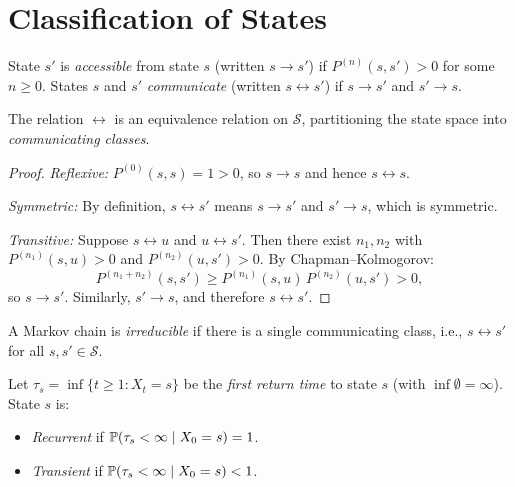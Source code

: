 \documentclass[11pt,a4paper]{article}
\begin{document}

\section{Classification of States}
\label{sec:classification}

\begin{definition}
\label{def:accessibility}
State $s'$ is \emph{accessible} from state $s$
(written $s \to s'$) if $P^{(n)}(s, s') > 0$ for some
$n \geq 0$.  States $s$ and $s'$ \emph{communicate}
(written $s \leftrightarrow s'$) if $s \to s'$ and $s' \to s$.
\end{definition}

\begin{proposition}
\label{prop:communication}
The relation $\leftrightarrow$ is an equivalence relation on
$\mathcal{S}$, partitioning the state space into
\emph{communicating classes}.
\end{proposition}

\begin{proof}
\textit{Reflexive:}  $P^{(0)}(s, s) = 1 > 0$, so $s \to s$ and
hence $s \leftrightarrow s$.

\textit{Symmetric:}  By definition, $s \leftrightarrow s'$ means
$s \to s'$ and $s' \to s$, which is symmetric.

\textit{Transitive:}  Suppose $s \leftrightarrow u$ and
$u \leftrightarrow s'$.  Then there exist $n_1, n_2$ with
$P^{(n_1)}(s, u) > 0$ and $P^{(n_2)}(u, s') > 0$.  By
Chapman--Kolmogorov:
\begin{equation}
  P^{(n_1 + n_2)}(s, s')
  \geq P^{(n_1)}(s, u)\, P^{(n_2)}(u, s') > 0,
\end{equation}
so $s \to s'$.  Similarly, $s' \to s$, and therefore
$s \leftrightarrow s'$.
\end{proof}

\begin{definition}
\label{def:irreducible}
A Markov chain is \emph{irreducible} if there is a single
communicating class, i.e., $s \leftrightarrow s'$ for all
$s, s' \in \mathcal{S}$.
\end{definition}

\begin{definition}
\label{def:recurrence}
Let $\tau_s = \inf\{t \geq 1 : X_t = s\}$ be the
\emph{first return time} to state $s$ (with
$\inf \emptyset = \infty$).  State $s$ is:
\begin{itemize}[nosep]
  \item \emph{Recurrent} if
    $\mathbb{P}(\tau_s < \infty \mid X_0 = s) = 1$.
  \item \emph{Transient} if
    $\mathbb{P}(\tau_s < \infty \mid X_0 = s) < 1$.
\end{itemize}
\end{definition}
\end{document}
